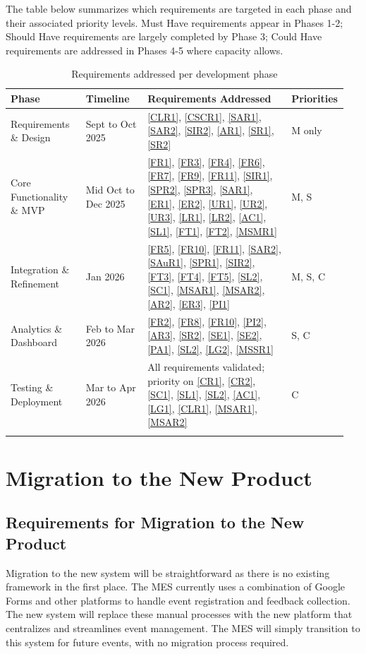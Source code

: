 \documentclass[12pt]{article}
\begin{document}
The table below summarizes which requirements are targeted in each phase and their associated 
priority levels. Must Have requirements appear in Phases 1-2; Should Have requirements are 
largely completed by Phase 3; Could Have requirements are addressed in Phases 4-5 where capacity 
allows.

{
\setlength{\tabcolsep}{0.3em}
\renewcommand{\arraystretch}{1.3}
\begin{longtable}[H]{p{0.22\linewidth}p{0.18\linewidth}p{0.42\linewidth}p{0.13\linewidth}}
  \toprule
  \textbf{Phase} & \textbf{Timeline} & \textbf{Requirements Addressed} & \textbf{Priorities} \\
  \midrule
  Requirements \& Design
    & Sept to Oct 2025
    & \ref{CLR1}, \ref{CSCR1}, \ref{SAR1}, \ref{SAR2}, \ref{SIR2}, \ref{AR1}, \ref{SR1}, \ref{SR2}
    & M only \\
  \midrule
  Core Functionality \& MVP
    & Mid Oct to Dec 2025
    & \ref{FR1}, \ref{FR3}, \ref{FR4}, \ref{FR6}, \ref{FR7}, \ref{FR9}, \ref{FR11}, \ref{SIR1},
      \ref{SPR2}, \ref{SPR3}, \ref{SAR1}, \ref{ER1}, \ref{ER2}, \ref{UR1}, \ref{UR2}, \ref{UR3},
      \ref{LR1}, \ref{LR2}, \ref{AC1}, \ref{SL1}, \ref{FT1}, \ref{FT2}, \ref{MSMR1}
    & M, S \\
  \midrule
  Integration \& Refinement
    & Jan 2026
    & \ref{FR5}, \ref{FR10}, \ref{FR11}, \ref{SAR2}, \ref{SAuR1}, \ref{SPR1}, \ref{SIR2},
      \ref{FT3}, \ref{FT4}, \ref{FT5}, \ref{SL2}, \ref{SC1}, \ref{MSAR1}, \ref{MSAR2},
      \ref{AR2}, \ref{ER3}, \ref{PI1}
    & M, S, C \\
  \midrule
  Analytics \& Dashboard
    & Feb to Mar 2026
    & \ref{FR2}, \ref{FR8}, \ref{FR10}, \ref{PI2}, \ref{AR3}, \ref{SR2}, \ref{SE1}, \ref{SE2},
      \ref{PA1}, \ref{SL2}, \ref{LG2}, \ref{MSSR1}
    & S, C \\
  \midrule
  Testing \& Deployment
    & Mar to Apr 2026
    & All requirements validated; priority on \ref{CR1}, \ref{CR2}, \ref{SC1}, \ref{SL1},
      \ref{SL2}, \ref{AC1}, \ref{LG1}, \ref{CLR1}, \ref{MSAR1}, \ref{MSAR2}
    & C \\
  \bottomrule
  \caption{Requirements addressed per development phase}\label{tab:phasereqs}
\end{longtable}
}


\section{Migration to the New Product}
\subsection{Requirements for Migration to the New Product}
Migration to the new system will be straightforward as there is no existing framework in the first place. The MES currently uses a combination of Google Forms and other platforms to handle event registration and feedback collection. The new system will replace these manual processes with the new platform that centralizes and streamlines event management. The MES will simply transition to this system for future events, with no migration process required.
\end{document}
